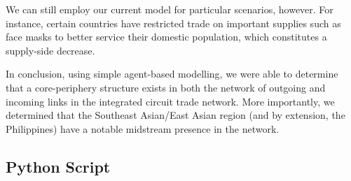 \documentclass[12pt,letterpaper]{report}
\begin{document}
We can still employ our current model for particular scenarios, however. For instance, certain countries have restricted trade on important supplies such as face masks to better service their domestic population, which constitutes a supply-side decrease.

In conclusion, using simple agent-based modelling, we were able to determine that a core-periphery structure exists in both the network of outgoing and incoming links in the integrated circuit trade network. More importantly, we determined that the Southeast Asian/East Asian region (and by extension, the Philippines) have a notable midstream presence in the network.

\nocite{*}

	\begin{appendices}
		\chapter{Python Script}
		
	\end{appendices}


\end{document}
